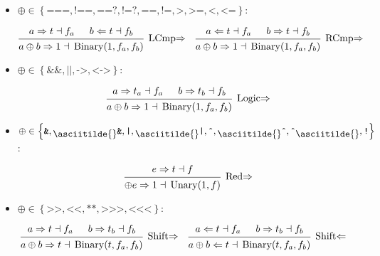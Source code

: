 \documentclass{article}
\DeclareMathOperator{\Binary}{Binary}
\DeclareMathOperator{\Unary}{Unary}
\newcommand{\mytilde}{\raisebox{-.7ex}{\asciitilde{}}}
\newcommand{\comp}{\ensuremath{\left\{
      \texttt{===}, \texttt{!==}, \texttt{==?}, \texttt{!=?}, \texttt{==},
      \texttt{!=}, \texttt{>}, \texttt{>=}, \texttt{<}, \texttt{<=}
    \right\}}}
\newcommand{\logic}{\ensuremath{\left\{\texttt{\&\&}, \texttt{||}, \texttt{->},
      \texttt{<->}\right\}}}
\newcommand{\red}{\ensuremath{\left\{
      \texttt{\&}, \mytilde\texttt{\&}, \texttt{|}, \mytilde\texttt{|},
      \texttt{\^{}}, \mytilde\texttt{\^{}}, \texttt{\^{}}\mytilde, \texttt{!}
    \right\}}}
\newcommand{\shift}{\ensuremath{\left\{
      \texttt{>>}, \texttt{<}\texttt{<}, \texttt{**}, \texttt{>>>},
      \texttt{<}\texttt{<}\texttt{<}
    \right\}}}
\renewcommand{\S}{\ensuremath{\Rightarrow}}
\newcommand{\C}{\ensuremath{\Leftarrow}}
\newcommand{\s}[3]{#1 \S{} #2 \dashv{} #3}
\renewcommand{\c}[3]{#1 \C{} #2 \dashv{} #3}
\begin{document}
\begin{itemize}[leftmargin=*]
	\item $\oplus \in \comp$:

	      \begin{align*}
		       &
		      \begin{prooftree}
			      \hypo{\s{a}{t}{f_a}}
			      \hypo{\c{b}{t}{f_b}}
			      \infer2[LCmp\S]{\s{a \oplus b}{1}{\Binary(1, f_a, f_b)}}
		      \end{prooftree}
		       &
		       &
		      \begin{prooftree}
			      \hypo{\c{a}{t}{f_a}}
			      \hypo{\s{b}{t}{f_b}}
			      \infer2[RCmp\S]{\s{a \oplus b}{1}{\Binary(1, f_a, f_b)}}
		      \end{prooftree}
	      \end{align*}

	\item $\oplus \in \logic$:

	      \begin{equation*}
		      \begin{prooftree}
			      \hypo{\s{a}{t_a}{f_a}}
			      \hypo{\s{b}{t_b}{f_b}}
			      \infer2[Logic\S]{\s{a \oplus b}{1}{\Binary(1, f_a, f_b)}}
		      \end{prooftree}
	      \end{equation*}

	\item $\oplus \in \red$:

	      \begin{equation*}
		      \begin{prooftree}
			      \hypo{\s{e}{t}{f}}
			      \infer1[Red\S]{\s{\oplus e}{1}{\Unary(1, f)}}
		      \end{prooftree}
	      \end{equation*}


	\item $\oplus \in \shift$:

	      \begin{align*}
		       &
		      \begin{prooftree}
			      \hypo{\s{a}{t}{f_a}}
			      \hypo{\s{b}{t_b}{f_b}}
			      \infer2[Shift\S]{\s{a \oplus b}{t}{\Binary(t, f_a, f_b)}}
		      \end{prooftree}
		       &
		       &
		      \begin{prooftree}
			      \hypo{\c{a}{t}{f_a}}
			      \hypo{\s{b}{t_b}{f_b}}
			      \infer2[Shift\C]{\c{a \oplus b}{t}{\Binary(t, f_a, f_b)}}
		      \end{prooftree}
	      \end{align*}


\end{itemize}
\end{document}
